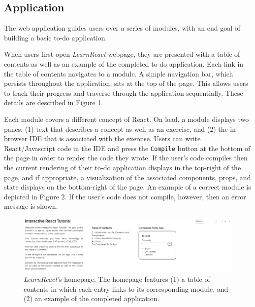 \documentclass[11pt]{article}
\newcommand{\figcaption}[1]{\caption[]{#1}}
\begin{document}
\subsection*{Application}


The web application guides users over a series of modules, with an end goal of building a basic to-do application.

When users first open \textit{LearnReact} webpage, they are presented with a table of contents as well as an example of the completed to-do application. Each link in the table of contents navigates to a module. A simple navigation bar, which persists throughout the application, sits at the top of the page. This allows users to track their progress and traverse through the application sequentially. These details are described in Figure 1.

Each module covers a different concept of React. On load, a module displays two panes: (1) text that describes a concept as well as an exercise, and (2) the in-browser IDE that is associated with the exercise. Users can write React/Javascript code in the IDE and press the \texttt{Compile} button at the bottom of the page in order to render the code they wrote. If the user's code compiles then the current rendering of their to-do application displays in the top-right of the page, and if appropriate, a visualization of the associated components, props, and state displays on the bottom-right of the page. An example of a correct module is depicted in Figure 2. If the user's code does not compile, however, then an error message is shown.

\begin{figure}[h]

\begin{center}
\includegraphics[scale=0.35]{homepage.png}
\end{center}

\figcaption{\textit{LearnReact}'s homepage. The homepage features (1) a table of contents in which each entry links to its corresponding module, and (2) an example of the completed application.}

\label{fig:Homepage}

\end{figure}
\end{document}
